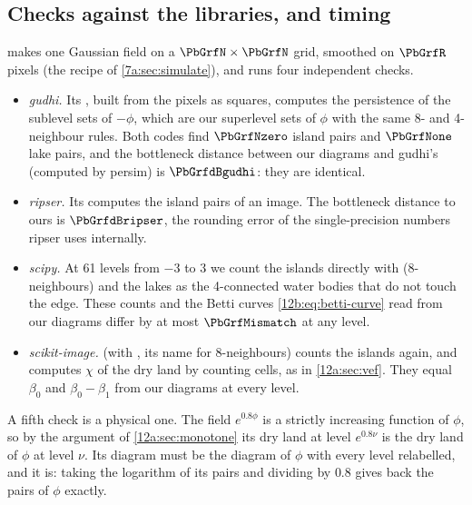 \subsection{Checks against the libraries, and timing}
\label{12b:sec:checks}

 makes one Gaussian field on a $\PbGrfN\times\PbGrfN$ grid, smoothed on
$\PbGrfR$ pixels (the recipe of \cref{7a:sec:simulate}), and runs four independent checks.
\begin{itemize}[itemsep=1pt,leftmargin=1.2em]
  \item \emph{gudhi.} Its , built from the pixels as squares, computes the persistence of
        the sublevel sets of $-\phi$, which are our superlevel sets of $\phi$ with the same 8- and
        4-neighbour rules. Both codes find $\PbGrfNzero$ island pairs and $\PbGrfNone$ lake pairs, and the
        bottleneck distance between our diagrams and gudhi's (computed by persim) is $\PbGrfdBgudhi$: they are
        identical.
  \item \emph{ripser.} Its  computes the island pairs of an image. The bottleneck distance
        to ours is $\PbGrfdBripser$, the rounding error of the single-precision numbers ripser uses internally.
  \item \emph{scipy.} At 61 levels from $-3$ to $3$ we count the islands directly with
         (8-neighbours) and the lakes as the 4-connected water bodies that do not
        touch the edge. These counts and the Betti curves \eqref{12b:eq:betti-curve} read from our diagrams differ
        by at most $\PbGrfMismatch$ at any level.
  \item \emph{scikit-image.}  (with , its name for 8-neighbours)
        counts the islands again, and  computes $\chi$ of the dry land by counting
        cells, as in \cref{12a:sec:vef}. They equal $\beta_0$ and $\beta_0-\beta_1$ from our diagrams at
        every level.
\end{itemize}
A fifth check is a physical one. The field $e^{0.8\phi}$ is a strictly increasing function of $\phi$, so by the
argument of \cref{12a:sec:monotone} its dry land at level $e^{0.8\nu}$ is the dry land of $\phi$ at level $\nu$.
Its diagram must be the diagram of $\phi$ with every level relabelled, and it is: taking the logarithm of its
pairs and dividing by $0.8$ gives back the pairs of $\phi$ exactly.

